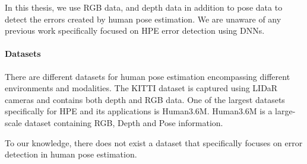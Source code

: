 In this thesis, we use RGB data, and depth data in addition to pose data to detect the errors created by human pose estimation. We are unaware of any previous work specifically focused on HPE error detection using DNNs.

\paragraph{Datasets}

There are different datasets for human pose estimation encompassing different environments and modalities. The KITTI dataset is captured using LIDaR cameras and contains both depth and RGB data\cite{Geiger2012CVPR}. One of the largest datasets specifically for HPE and its applications is Human3.6M\cite{h36m_pami}. Human3.6M is a large-scale dataset containing RGB, Depth and Pose information.

To our knowledge, there does not exist a dataset that specifically focuses on error detection in human pose estimation.
